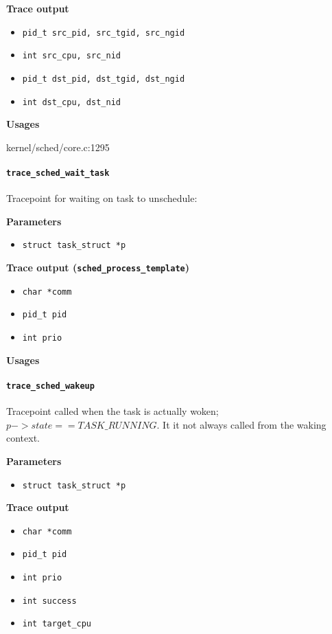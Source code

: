 \textbf{Trace output}
\begin{itemize}
    \item \verb|pid_t src_pid, src_tgid, src_ngid|
    \item \verb|int src_cpu, src_nid|
    \item \verb|pid_t dst_pid, dst_tgid, dst_ngid|
    \item \verb|int dst_cpu, dst_nid|
\end{itemize}

\textbf{Usages}
\begin{code}
kernel/sched/core.c:1295
\end{code}

\paragraph{\texttt{trace\_sched\_wait\_task}}
Tracepoint for waiting on task to unschedule:

\textbf{Parameters}
\begin{itemize}
    \item \verb|struct task_struct *p|
\end{itemize}

\textbf{Trace output (\texttt{sched\_process\_template})}
\begin{itemize}
    \item \verb|char *comm|
    \item \verb|pid_t pid|
    \item \verb|int prio|
\end{itemize}

\textbf{Usages}
\begin{code}

\end{code}

\paragraph{\texttt{trace\_sched\_wakeup}}
Tracepoint called when the task is actually woken; $p->state == TASK\_RUNNING$. It it not always called from the waking context.

\textbf{Parameters}
\begin{itemize}
    \item \verb|struct task_struct *p|
\end{itemize}

\textbf{Trace output}
\begin{itemize}
    \item \verb|char *comm|
    \item \verb|pid_t pid|
    \item \verb|int prio|
    \item \verb|int success|
    \item \verb|int target_cpu|
\end{itemize}

